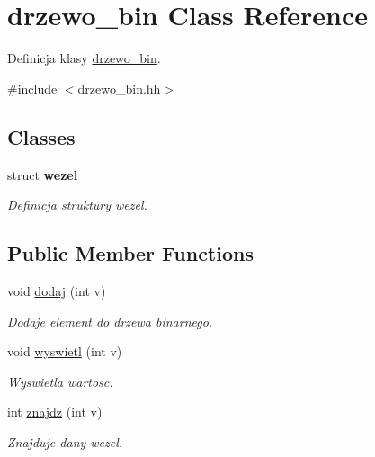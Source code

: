 \hypertarget{classdrzewo__bin}{\section{drzewo\-\_\-bin \-Class \-Reference}
\label{classdrzewo__bin}
}


\-Definicja klasy \hyperlink{classdrzewo__bin}{drzewo\-\_\-bin}.  




{\ttfamily \#include $<$drzewo\-\_\-bin.\-hh$>$}

\subsection*{\-Classes}
\begin{DoxyCompactItemize}
\item 
struct {\bfseries wezel}
\begin{DoxyCompactList}\small\item\em \-Definicja struktury wezel. \end{DoxyCompactList}\end{DoxyCompactItemize}
\subsection*{\-Public \-Member \-Functions}
\begin{DoxyCompactItemize}
\item 
\hypertarget{classdrzewo__bin_a6825fd62111b4493279150ac257b02e3}{void \hyperlink{classdrzewo__bin_a6825fd62111b4493279150ac257b02e3}{dodaj} (int v)}\label{classdrzewo__bin_a6825fd62111b4493279150ac257b02e3}

\begin{DoxyCompactList}\small\item\em \-Dodaje element do drzewa binarnego. \end{DoxyCompactList}\item 
\hypertarget{classdrzewo__bin_aeafc13c413d539247cc00ffdc5649cc8}{void \hyperlink{classdrzewo__bin_aeafc13c413d539247cc00ffdc5649cc8}{wyswietl} (int v)}\label{classdrzewo__bin_aeafc13c413d539247cc00ffdc5649cc8}

\begin{DoxyCompactList}\small\item\em \-Wyswietla wartosc. \end{DoxyCompactList}\item 
\hypertarget{classdrzewo__bin_a23a27e6fdd94f2842e661812fa570b6f}{int \hyperlink{classdrzewo__bin_a23a27e6fdd94f2842e661812fa570b6f}{znajdz} (int v)}\label{classdrzewo__bin_a23a27e6fdd94f2842e661812fa570b6f}

\begin{DoxyCompactList}\small\item\em \-Znajduje dany wezel. \end{DoxyCompactList}\end{DoxyCompactItemize}


